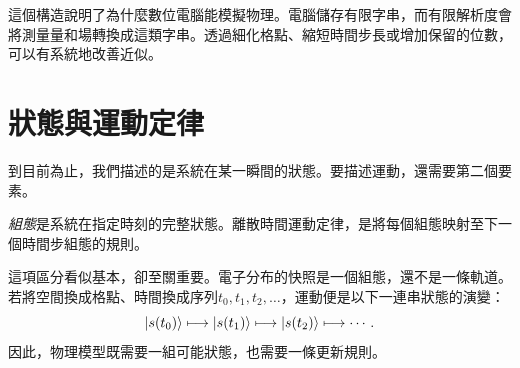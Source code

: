 這個構造說明了為什麼數位電腦能模擬物理。電腦儲存有限字串，而有限解析度會將測量量和場轉換成這類字串。透過細化格點、縮短時間步長或增加保留的位數，可以有系統地改善近似。

\begin{classroomqa}
\end{classroomqa}

\begin{classroomqa}
\end{classroomqa}

\section{狀態與運動定律}

到目前為止，我們描述的是系統在某一瞬間的狀態。要描述運動，還需要第二個要素。

\begin{definition}
\emph{組態}是系統在指定時刻的完整狀態。離散時間運動定律，是將每個組態映射至下一個時間步組態的規則。
\end{definition}

這項區分看似基本，卻至關重要。電子分布的快照是一個組態，還不是一條軌道。若將空間換成格點、時間換成序列\(t_0,t_1,t_2,\ldots\)，運動便是以下一連串狀態的演變：
\begin{equation}
  \left\lvert s(t_0)\right\rangle
  \longmapsto
  \left\lvert s(t_1)\right\rangle
  \longmapsto
  \left\lvert s(t_2)\right\rangle
  \longmapsto\cdots.
  \label{eq:l01-discrete-motion}
\end{equation}
因此，物理模型既需要一組可能狀態，也需要一條更新規則。

\begin{classroomqa}
\end{classroomqa}

